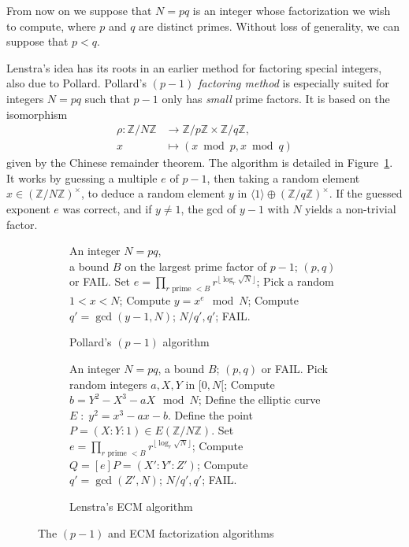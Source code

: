 \documentclass[10pt]{article}
\theoremstyle{plain}
\theoremstyle{definition}
\begin{document}
From now on we suppose that $N=pq$ is an integer whose factorization
we wish to compute, where $p$ and $q$ are distinct primes. %
Without loss of generality, we can suppose that $p<q$.

Lenstra's idea has its roots in an earlier method for factoring
special integers, also due to Pollard. %
Pollard's \emph{$(p-1)$ factoring method} is especially suited for
integers $N=pq$ such that $p-1$ only has \emph{small} prime factors. %
It is based on the isomorphism
\begin{align*}
  \rho : ℤ/Nℤ &\to ℤ/pℤ × ℤ/qℤ,\\
  x &\mapsto (x \bmod p, x \bmod q)
\end{align*}
given by the Chinese remainder theorem. %
The algorithm is detailed in Figure~\ref{fig:p-1}. %
It works by guessing a multiple $e$ of $p-1$, then taking a random
element $x∈(ℤ/Nℤ)^{×}$, to deduce a random element $y$ in
$〈1〉⊕(ℤ/qℤ)^{×}$. If the guessed exponent $e$ was correct, and if
$y≠1$, the gcd of $y-1$ with $N$ yields a non-trivial factor. %

\begin{figure}
  \begin{subfigure}{0.45\textwidth}
    \begin{algorithmic}[1]
      \REQUIRE An integer $N=pq$,\\
      a bound $B$ on the largest prime factor of $p-1$;
      \ENSURE $(p,q)$ or FAIL.
      \STATE Set $e = \prod_{r \text{ prime } < B} r^{\lfloor\log_r\sqrt{N}\rfloor}$;
      \STATE Pick a random $1 < x < N$;
      \STATE Compute $y = x^e \mod N$;
      \STATE Compute $q' = \gcd(y-1, N)$;
      \RETURN $N/q', q'$;
      \ELSE
      \RETURN FAIL.
      \ENDIF
    \end{algorithmic}
    
    \caption{Pollard's $(p-1)$ algorithm}
    \label{fig:p-1}
  \end{subfigure}
  \hfill
  \begin{subfigure}{0.45\textwidth}
    \begin{algorithmic}[1]
      \REQUIRE An integer $N=pq$, a bound $B$;
      \ENSURE $(p,q)$ or FAIL.
      \STATE Pick random integers $a,X,Y$ in $[0,N[$;
      \STATE Compute $b = Y^2 - X^3 - aX \mod N$;
      \STATE Define the elliptic curve $E \;:\; y^2 = x^3 - ax - b$.
      \STATE Define the point $P=(X:Y:1) ∈ E(ℤ/Nℤ)$.
      \STATE Set $e = \prod_{r \text{ prime } < B} r^{\lfloor\log_r\sqrt{N}\rfloor}$;
      \STATE Compute $Q = [e]P = (X':Y':Z')$;
      \STATE Compute $q' = \gcd(Z', N)$;
      \RETURN $N/q', q'$;
      \ELSE
      \RETURN FAIL.
      \ENDIF
    \end{algorithmic}
    
    \caption{Lenstra's ECM algorithm}
    \label{fig:ecm}
  \end{subfigure}
  \caption{The $(p-1)$ and ECM factorization algorithms}
\end{figure}
\end{document}

